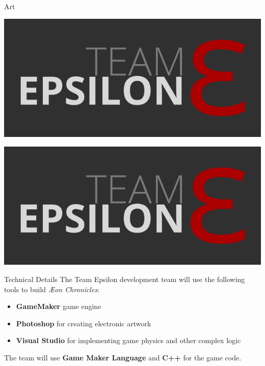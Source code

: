 \documentclass{teamepsilon}
\begin{document}
\begin{frame}{Art}

\begin{minipage}{0.65\textwidth}
\includegraphics[width=\textwidth]{../logo/team-epsilon.png}
\end{minipage}%

\begin{minipage}{0.35\textwidth}
\includegraphics[width=\textwidth]{../logo/team-epsilon.png}
\end{minipage}

\end{frame}

\begin{frame}{Technical Details}
    The Team Epsilon development team will use the following tools to build
    \textit{{\AE}on Chronicles}:

    \begin{itemize}
        \item \textbf{GameMaker} game engine
        \item \textbf{Photoshop} for creating electronic artwork
        \item \textbf{Visual Studio} for implementing game physics and other
            complex logic
    \end{itemize}

    The team will use \textbf{Game Maker Language} and \textbf{C++} for the game
    code.
\end{frame}
\end{document}
